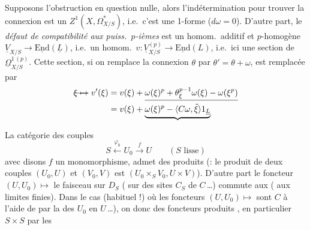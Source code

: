 \documentclass[11pt,a4paper]{article}
\begin{document}
Supposons l'obstruction en question nulle,  alors l'indétermination pour trouver la connexion  est un $Z^{1}(X, \Omega^{*}_{X/S})$, i.e.\ c'est une 1-forme   ($d\omega = 0$).   D'autre part, le \emph{défaut de compatibilité aux puiss.\ $p$-ièmes} est  un homom.\ additif et $p$-homogène $\underline{V}_{X/S} \to \underline{\mathrm{End}}(\underline{L})$, i.e.\ un homom.\ $v : \underline{V}^{(p)}_{X/S} \to \underline{\mathrm{End}}(L)$, i.e.\ ici une section de $\underline{\Omega}^{1\,(p)}_{X/S}$. Cette section, si on remplace la connexion $\theta$ par $\theta' = \theta + \omega$, est remplacée par
\[
\begin{aligned}
\text{\struck{$\xi \mapsto$}}\ v'(\xi) &= v(\xi) + \underline{\omega(\xi)^{p} + \theta_{\xi}^{p-1}\omega(\xi) - \omega(\xi^{p})} \\
&= v(\xi) + \underbrace{\omega(\xi)^{p} - \langle C\omega, \tilde{\xi} \rangle 1_{\underline{L}}}
\end{aligned}
\]

La catégorie des couples \ill{} \ill{}
\[
S \xleftarrow{\varphi_{0}} U_{0} \xrightarrow{f} U \qquad (S \text{ lisse})
\]
avec disons $f$ un monomorphisme, admet des produits (: \ill{} le produit de deux couples $(U_{0}, U)$ et $(V_{0}, V)$ est $(U_{0} \times_{S} V_{0}, U \times V)$). D'autre part le foncteur $(U, U_{0}) \mapsto$ \ill{} le faisceau  sur $D_{S}$ (\ill{} sur \ill{} des sites $C_{S}$ de \ill{} $C$\,…) commute aux  ( aux limites finies). Dans le cas (habituel !) où les foncteurs \ill{} $(U, U_{0}) \mapsto$ \ill{} sont  \ill{} $C$ à l'aide de \ill{}  par la  des \ill{} $U_{0}$ en $U$\,…), on  donc des foncteurs produits , en particulier $S \times S$  par les \ill{}

\end{document}
